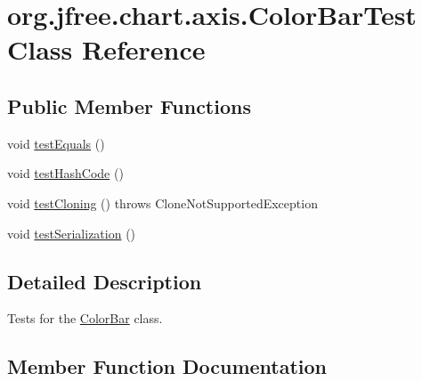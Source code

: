 \hypertarget{classorg_1_1jfree_1_1chart_1_1axis_1_1_color_bar_test}{}\section{org.\+jfree.\+chart.\+axis.\+Color\+Bar\+Test Class Reference}
\label{classorg_1_1jfree_1_1chart_1_1axis_1_1_color_bar_test}
\subsection*{Public Member Functions}
\begin{DoxyCompactItemize}
\item 
void \mbox{\hyperlink{classorg_1_1jfree_1_1chart_1_1axis_1_1_color_bar_test_a9eb1dcd26872b8d02ea91dfd41a06e44}{test\+Equals}} ()
\item 
void \mbox{\hyperlink{classorg_1_1jfree_1_1chart_1_1axis_1_1_color_bar_test_aa7c2451deb8a585317d0879269742d78}{test\+Hash\+Code}} ()
\item 
void \mbox{\hyperlink{classorg_1_1jfree_1_1chart_1_1axis_1_1_color_bar_test_a3b15d87613846712a0dae12fb20f3ca1}{test\+Cloning}} ()  throws Clone\+Not\+Supported\+Exception 
\item 
void \mbox{\hyperlink{classorg_1_1jfree_1_1chart_1_1axis_1_1_color_bar_test_abfa237dcedb2a2f93d9445cdf5d80c8f}{test\+Serialization}} ()
\end{DoxyCompactItemize}


\subsection{Detailed Description}
Tests for the {\ttfamily \mbox{\hyperlink{classorg_1_1jfree_1_1chart_1_1axis_1_1_color_bar}{Color\+Bar}}} class. 

\subsection{Member Function Documentation}
\mbox{\label{classorg_1_1jfree_1_1chart_1_1axis_1_1_color_bar_test_a3b15d87613846712a0dae12fb20f3ca1}} 
